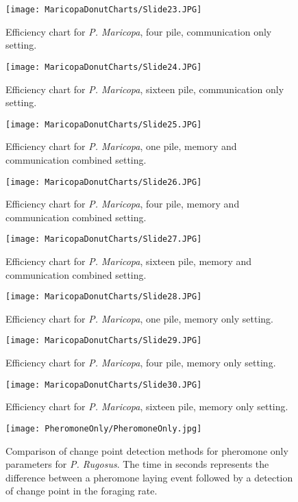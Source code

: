 \begin{figure}[h]
	\texttt{[image: MaricopaDonutCharts/Slide23.JPG]}
	\caption{Efficiency chart for \textit{P. Maricopa}, four pile,  communication only setting.}
\end{figure}
\begin{figure}[h]
	\texttt{[image: MaricopaDonutCharts/Slide24.JPG]}
	\caption{Efficiency chart for \textit{P. Maricopa}, sixteen pile,  communication only setting.}
\end{figure}
\begin{figure}[h]
	\texttt{[image: MaricopaDonutCharts/Slide25.JPG]}
	\caption{Efficiency chart for \textit{P. Maricopa}, one pile,  memory and communication combined setting.}
\end{figure}
\begin{figure}[h]
	\texttt{[image: MaricopaDonutCharts/Slide26.JPG]}
	\caption{Efficiency chart for \textit{P. Maricopa}, four pile, memory and communication combined setting.}
\end{figure}
\begin{figure}[h]
	\texttt{[image: MaricopaDonutCharts/Slide27.JPG]}
	\caption{Efficiency chart for \textit{P. Maricopa}, sixteen pile,  memory and communication combined setting.}
\end{figure}
\begin{figure}[h]
	\texttt{[image: MaricopaDonutCharts/Slide28.JPG]}
	\caption{Efficiency chart for \textit{P. Maricopa}, one pile,  memory only setting.}
\end{figure}
\begin{figure}[h]
	\texttt{[image: MaricopaDonutCharts/Slide29.JPG]}
	\caption{Efficiency chart for \textit{P. Maricopa}, four pile,  memory only setting.}
\end{figure}
\begin{figure}[h]
	\texttt{[image: MaricopaDonutCharts/Slide30.JPG]}
	\caption{Efficiency chart for \textit{P. Maricopa}, sixteen pile,  memory only setting.}
\end{figure}
\clearpage
\begin{figure}
	\texttt{[image: PheromoneOnly/PheromoneOnly.jpg]}
	\caption{Comparison of change point detection methods for pheromone only parameters for \textit{P. Rugosus}. The time in seconds represents the difference between a pheromone laying event followed by a detection of change point in the foraging rate.}
\end{figure}
